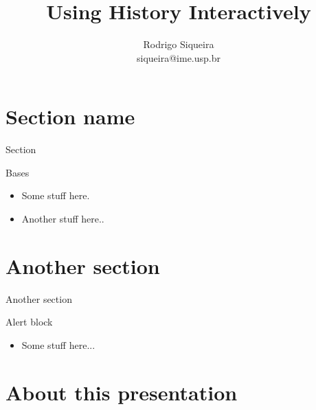 \documentclass[10pt, compress, aspectratio=169]{beamer}
\title{Using History Interactively}
\author{\footnotesize Rodrigo Siqueira \\ {\scriptsize siqueira@ime.usp.br}}
\begin{document}
\maketitle

\section{Section name}
\begin{frame}{Section}
  \begin{exampleblock}{Bases}
    \begin{itemize}
      \item Some stuff here.
      \item Another stuff here..
    \end{itemize}
  \end{exampleblock}
\end{frame}

\section{Another section}

\begin{frame}{Another section}
  \begin{alertblock}{Alert block}
    \begin{itemize}
      \item Some stuff here...
    \end{itemize}
  \end{alertblock}
\end{frame}

\section{About this presentation}
\begin{frame}[standout]
   \begin{center}\ccbysa\end{center}
\end{frame}

\maketitle
\end{document}
